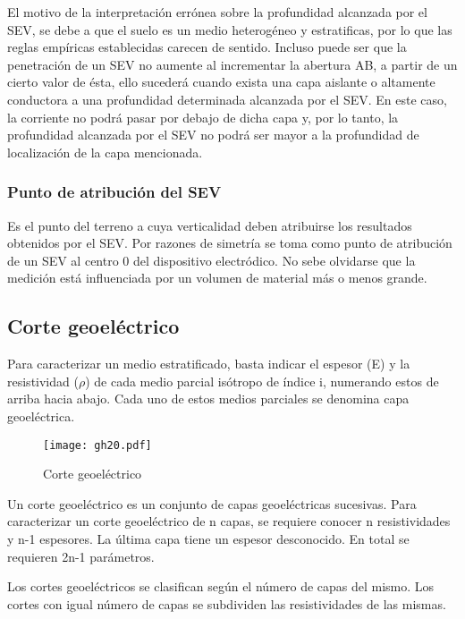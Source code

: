 El motivo de la interpretación errónea sobre la profundidad alcanzada por el SEV, se debe a que el suelo es un medio heterogéneo y estratificas, por lo que las reglas empíricas establecidas carecen de sentido. Incluso puede ser que la penetración de un SEV no aumente al incrementar la abertura AB, a partir de un cierto valor de ésta, ello sucederá cuando exista una capa aislante o altamente conductora a una profundidad determinada alcanzada por el SEV. En este caso, la corriente no podrá pasar por debajo de dicha capa y, por lo tanto, la profundidad alcanzada por el SEV no podrá ser mayor a la profundidad de localización de la capa mencionada.
\subsubsection{Punto de atribución del SEV}
Es el punto del terreno a cuya verticalidad deben atribuirse los resultados obtenidos por el SEV. Por razones de simetría se toma como punto de atribución de un SEV al centro 0 del dispositivo electródico. No sebe olvidarse que la medición está influenciada por un volumen de material más o menos grande.
\subsection{Corte geoeléctrico}
Para caracterizar un medio estratificado, basta indicar el espesor (E) y la resistividad ($\rho$) de cada medio parcial isótropo de índice i, numerando estos de arriba hacia abajo. Cada uno de estos medios parciales se denomina capa geoeléctrica.
\begin{figure}[h!]
\centering
  \texttt{[image: gh20.pdf]}
  \caption{Corte geoeléctrico}
  \label{gh20}
\end{figure}
Un corte geoeléctrico es un conjunto de capas geoeléctricas sucesivas. Para caracterizar un corte geoeléctrico de n capas, se requiere conocer n resistividades y n-1 espesores. La última capa tiene un espesor desconocido. En total se requieren 2n-1 parámetros.

Los cortes geoeléctricos se clasifican según el número de capas del mismo. Los cortes con igual número de capas se subdividen las resistividades de las mismas.
